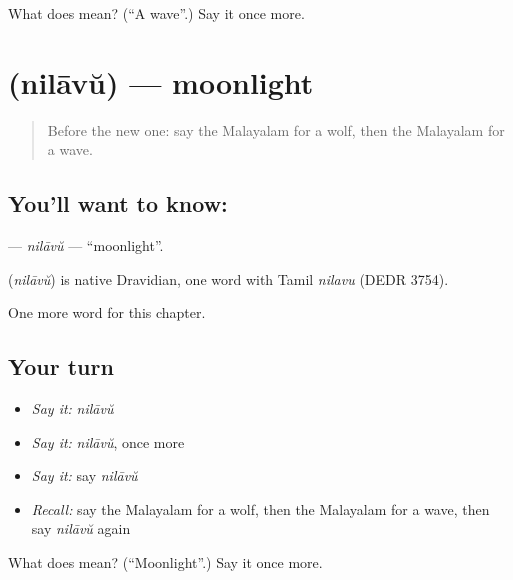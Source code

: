 \begin{tcolorbox}[breakable,colback=teal!4,colframe=teal!35!black,title={Before you move on}]
What does  mean? (\textquotedblleft{}A wave\textquotedblright{}.) Say it once more.
\end{tcolorbox}
\section[\texorpdfstring{\ml{നിലാവ്} (nilāvŭ)}{നിലാവ് (nilāvŭ)}]{ (nilāvŭ) — moonlight}

\label{lesson:ML-C292-nilavu}



\begin{quote}
Before the new one: say the Malayalam for a wolf, then the Malayalam for a wave.
\end{quote}

\subsection*{You'll want to know: }
\textbf{} — \emph{nilāvŭ} — \textquotedblleft{}moonlight\textquotedblright{}.

\begin{cousinweb}
\textbf{} (\emph{nilāvŭ}) is native Dravidian, one word with Tamil \emph{nilavu} (DEDR 3754).
\end{cousinweb}

\begin{grammarlens}[title={What you've built}]
One more word for this chapter.
\end{grammarlens}

\subsection*{Your turn}
\begin{itemize}
\raggedright
  \item \emph{Say it:} \emph{nilāvŭ}
  \item \emph{Say it:} \emph{nilāvŭ}, once more
  \item \emph{Say it:} say \emph{nilāvŭ}
  \item \emph{Recall:} say the Malayalam for a wolf, then the Malayalam for a wave, then say \emph{nilāvŭ} again
\end{itemize}

\begin{tcolorbox}[breakable,colback=teal!4,colframe=teal!35!black,title={Before you move on}]
What does  mean? (\textquotedblleft{}Moonlight\textquotedblright{}.) Say it once more.
\end{tcolorbox}
